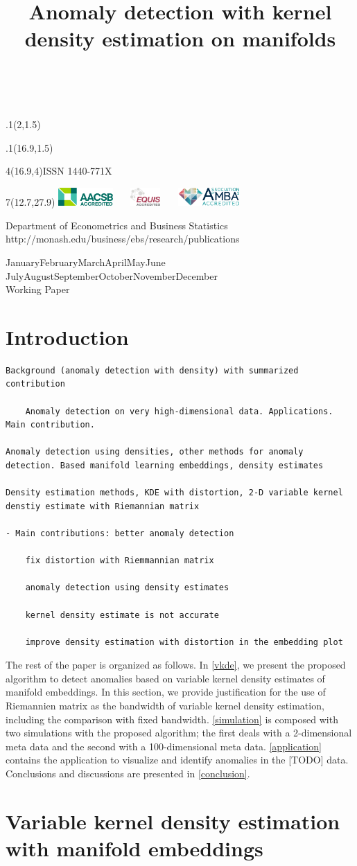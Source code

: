 \documentclass[11pt,a4paper,]{article}
\title{Anomaly detection with kernel density estimation on manifolds}
\date{\sf\Date~\Month~\Year}
\makeatletter
\def\Date{\number\day}
\def\Month{\ifcase\month\or
 January\or February\or March\or April\or May\or June\or
 July\or August\or September\or October\or November\or December\fi}
\def\Year{\number\year}
\def\showjel{{\large\textsf{\textbf{JEL classification:}}~\@jel}}
\def\cover{{\sffamily\setcounter{page}{0}
        \thispagestyle{empty}
        \placefig{2}{1.5}{width=5cm}{monash2}
        \placefig{16.9}{1.5}{width=2.1cm}{MBusSchool}
        \begin{textblock}{4}(16.9,4)ISSN 1440-771X\end{textblock}
        \begin{textblock}{7}(12.7,27.9)\hfill
        \includegraphics[height=0.7cm]{AACSB}~~~
        \includegraphics[height=0.7cm]{EQUIS}~~~
        \includegraphics[height=0.7cm]{AMBA}
        \end{textblock}
        \vspace*{2cm}
        \begin{center}\Large
        Department of Econometrics and Business Statistics\\[.5cm]
        \footnotesize http://monash.edu/business/ebs/research/publications
        \end{center}\vspace{2cm}
        \begin{center}
        \fbox{\parbox{14cm}{\begin{onehalfspace}\centering\Huge\vspace*{0.3cm}
                \textsf{\textbf{\expandafter{\@title}}}\vspace{1cm}\par
                \LARGE\@author\end{onehalfspace}
        }}
        \end{center}
        \vfill
                \begin{center}\Large
                \Month~\Year\\[1cm]
                Working Paper \@wp
        \end{center}\vspace*{2cm}}}
\def\pageone{{\sffamily\setstretch{1}%
        \thispagestyle{empty}%
        \vbox to \textheight{%
        \raggedright\baselineskip=1.2cm
     {\fontsize{24.88}{30}\sffamily\textbf{\expandafter{\@title}}}
        \vspace{2cm}\par
        \hspace{1cm}\parbox{14cm}{\sffamily\large\@addresses}\vspace{1cm}\vfill
        \hspace{1cm}{\large\Date~\Month~\Year}\\[1cm]
        \hspace{1cm}\showjel\vss}}}
\def\blindtitle{{\sffamily
     \thispagestyle{plain}\raggedright\baselineskip=1.2cm
     {\fontsize{24.88}{30}\sffamily\textbf{\expandafter{\@title}}}\vspace{1cm}\par
        }}
\def\titlepage{{\cover\newpage\pageone\newpage\blindtitle}}
\let\maketitle\titlepage
\def\placefig#1#2#3#4{\begin{textblock}{.1}(#1,#2)\rlap{\texttt{[image: \#4]}}\end{textblock}}
\makeatother
\begin{document}
\maketitle

\hypertarget{introduction}{%
\section{Introduction}\label{introduction}}

\begin{verbatim}
Background (anomaly detection with density) with summarized contribution

    Anomaly detection on very high-dimensional data. Applications. Main contribution.

Anomaly detection using densities, other methods for anomaly detection. Based manifold learning embeddings, density estimates

Density estimation methods, KDE with distortion, 2-D variable kernel denstiy estimate with Riemannian matrix

- Main contributions: better anomaly detection

    fix distortion with Riemmannian matrix

    anomaly detection using density estimates

    kernel density estimate is not accurate

    improve density estimation with distortion in the embedding plot
\end{verbatim}

The rest of the paper is organized as follows.
In \autoref{vkde}, we present the proposed algorithm to detect anomalies based on variable kernel density estimates of manifold embeddings. In this section, we provide justification for the use of Riemannien matrix as the bandwidth of variable kernel density estimation, including the comparison with fixed bandwidth.
\autoref{simulation} is composed with two simulations with the proposed algorithm; the first deals with a 2-dimensional meta data and the second with a 100-dimensional meta data.
\autoref{application} contains the application to visualize and identify anomalies in the {[}TODO{]} data.
Conclusions and discussions are presented in \autoref{conclusion}.

\hypertarget{vkde}{%
\section{Variable kernel density estimation with manifold embeddings}\label{vkde}}
\end{document}
